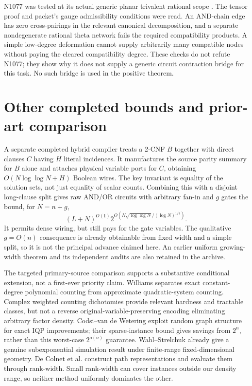 \documentclass[11pt,a4paper]{article}
\theoremstyle{remark}\newtheorem{remark}[theorem]{Remark}
\begin{document}
N1077 was tested at its actual generic planar trivalent rational scope
\cite{n1077}. The tensor proof and packet's gauge admissibility conditions
were read. An AND-chain edge has zero cross-pairings in the relevant
canonical decomposition, and a separate nondegenerate rational theta
network fails the required compatibility products. A simple low-degree
deformation cannot supply arbitrarily many compatible nodes without
paying the cleared compatibility degree. These checks do not refute
N1077; they show why it does not supply a generic circuit contraction
bridge for this task. No such bridge is used in the positive theorem.

\section{Other completed bounds and prior-art comparison}
A separate completed hybrid compiler treats a 2-CNF $B$ together with
direct clauses $C$ having $H$ literal incidences. It manufactures the
source parity summary for $B$ alone and attaches physical variable ports
for $C$, obtaining $O(N\log\log N+H)$ Boolean wires. The key invariant
is equality of the solution sets, not just equality of scalar counts.
Combining this with a disjoint long-clause split gives raw AND/OR
circuits with arbitrary fan-in and $g$ gates the bound, for $N=n+g$,
\[
 (L+N)^{O(1)}
 2^{O\left(N\sqrt{\log\log N}/(\log N)^{1/4}\right)}.
\]
It permits dense wiring, but still pays for the gate variables.
The qualitative $g=O(n)$ consequence is already obtainable from fixed
width and a simple split, so it is not the principal advance claimed here.
An earlier uniform growing-width theorem and its independent audits are
also retained in the archive.

The targeted primary-source comparison supports a substantive conditional
extension, not a first-ever priority claim. Williams \cite{williams2018}
separates exact constant-degree polynomial counting from approximate
quadratic-system counting. Complex weighted counting dichotomies
\cite{liu} provide relevant hardness and tractable classes, but not a
reverse original-variable-preserving encoding eliminating arbitrary
factor density. Codsi--van de Wetering \cite{codsi} exploit random graph
structure for exact IQP improvements; their sparse-instance bound gives
savings from $2^n$, rather than this worst-case $2^{o(n)}$ guarantee.
Wahl--Strelchuk \cite{wahl} already give a genuine subexponential
simulation result under finite-range fixed-dimensional geometry.
De Colnet et al. \cite{decolnet} construct path representations and
evaluate them through rank-width. Small rank-width can cover instances
outside our density range, so neither method uniformly dominates the other.
\end{document}

